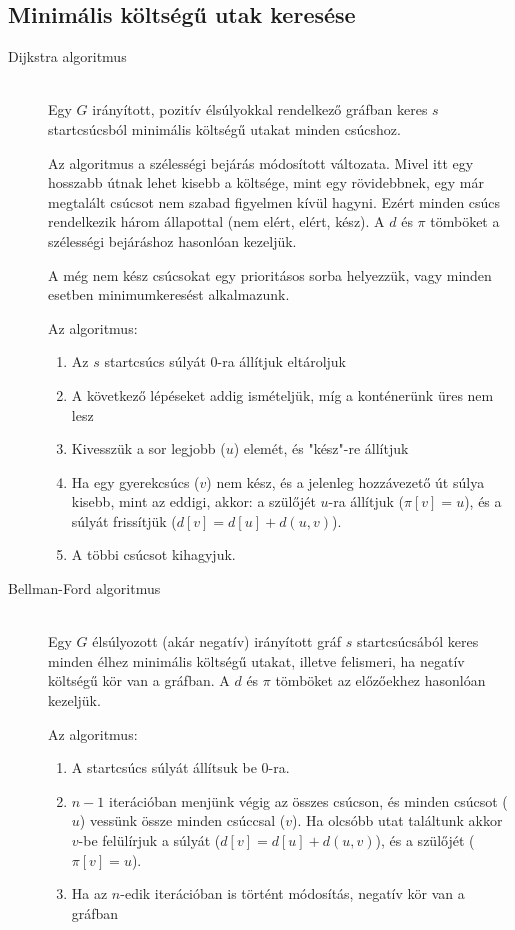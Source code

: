 \documentclass[margin=0px]{article}
\begin{document}
		\subsection{Minimális költségű utak keresése}
			\begin{description}
				\item[Dijkstra algoritmus] \hfill \\
					Egy $G$ irányított, pozitív élsúlyokkal rendelkező gráfban keres $s$ startcsúcsból minimális költségű utakat minden csúcshoz. 
					
					Az algoritmus a szélességi bejárás módosított változata. Mivel itt egy hosszabb útnak lehet kisebb a költsége, mint egy rövidebbnek, egy már megtalált csúcsot nem szabad figyelmen kívül hagyni. Ezért minden csúcs rendelkezik három állapottal (nem elért, elért, kész). A $d$ és $\pi$ tömböket a szélességi bejáráshoz hasonlóan kezeljük.
					
					A még nem kész csúcsokat egy prioritásos sorba helyezzük, vagy minden esetben minimumkeresést alkalmazunk.

				Az algoritmus:
				\begin{enumerate}
					\item Az $s$ startcsúcs súlyát 0-ra állítjuk eltároljuk
					\item A következő lépéseket addig ismételjük, míg a konténerünk üres nem lesz
					\item Kivesszük a sor legjobb ($u$) elemét, és "kész"-re állítjuk
					\item Ha egy gyerekcsúcs ($v$) nem kész, és a jelenleg hozzávezető út súlya kisebb, mint az eddigi, akkor: a szülőjét $u$-ra állítjuk ($\pi[v] = u$), és a súlyát frissítjük ($d[v] = d[u]+d(u,v)$).
					\item A többi csúcsot kihagyjuk.
				\end{enumerate}						
					
				\item[Bellman-Ford algoritmus] \hfill \\
					Egy $G$ élsúlyozott (akár negatív) irányított gráf $s$ startcsúcsából keres minden élhez minimális költségű utakat, illetve felismeri, ha negatív költségű kör van a gráfban. A $d$ és $\pi$ tömböket az előzőekhez hasonlóan kezeljük.
					
					Az algoritmus:
					\begin{enumerate}
						\item A startcsúcs súlyát állítsuk be 0-ra.
						\item $n-1$ iterációban menjünk végig az összes csúcson, és minden csúcsot ($u$) vessünk össze minden csúccsal ($v$). Ha olcsóbb utat találtunk akkor $v$-be felülírjuk a súlyát ($d[v] = d[u]+d(u,v)$), és a szülőjét ($\pi[v] = u$).
						\item Ha az $n$-edik iterációban is történt módosítás, negatív kör van a gráfban
					\end{enumerate}
			\end{description}
\end{document}
